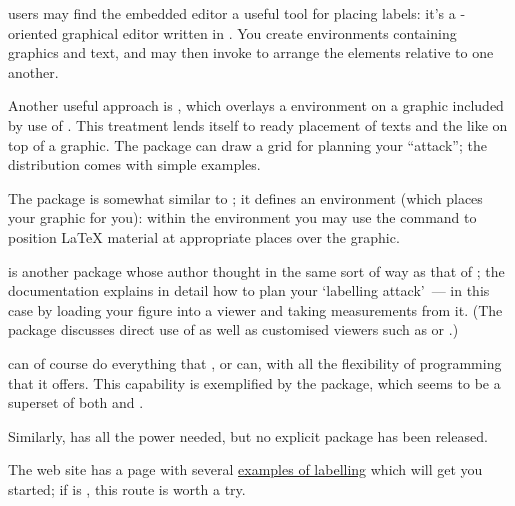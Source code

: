  users may find the embedded editor  a
useful tool for placing labels: it's a \AllTeX{}-oriented graphical
editor written in .  You create
 environments containing graphics and text, and
may then invoke  to arrange the elements relative to one
another.

Another useful approach is , which overlays a
 environment on a graphic included by use of
.  This treatment lends itself to ready placement
of texts and the like on top of a graphic.  The package can draw a
grid for planning your ``attack''; the distribution comes with simple
examples.

The  package is somewhat similar to ;
it defines an environment  (which places your
graphic for you): within the environment you may use the command
 to position \LaTeX{} material at appropriate places over the
graphic.

 is another package whose author thought in the same
sort of way as that of ; the documentation explains
in detail how to plan your `labelling attack'~--- in this case by
loading your figure into a viewer and taking measurements from it.
(The package discusses direct use of
\href{http://www.ghostscript.com/}{} as well as
customised viewers such as
\href{http://www.ghostgum.com.au/}{} or
.)

 can of course do everything
that ,  or 
can, with all the flexibility of \PS{} programming that it offers.
This capability is exemplified by the  package,
which seems to be a superset of both  and
.

Similarly,  has all the power needed, but no
explicit package has been released.

The  web site has a page with several %
\href{http://pstricks.tug.org/main.cgi?file=Examples/overlay}{examples of labelling}
which will get you started; if  is %
, this route is worth a try.

